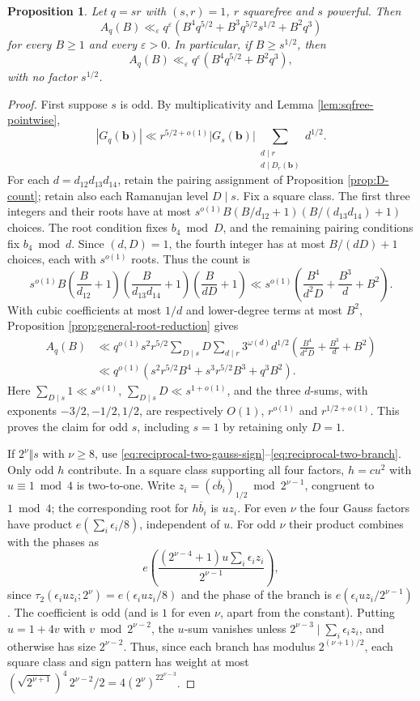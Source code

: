 \documentclass[12pt, a4paper]{amsart}
\numberwithin{equation}{section}
\newcommand{\e}{e}
\newcommand{\ep}{\varepsilon}
\renewcommand{\ge}{\geqslant}
\theoremstyle{plain}
\newtheorem{prop}[lem]{Proposition}
\begin{document}
\begin{prop}\label{prop:nsf-noloss}
Let $q=sr$ with $(s,r)=1$, $r$ squarefree and $s$ powerful. Then
$$
A_q(B)\ll_\ep q^\ep
\left(B^4q^{5/2}+B^3q^{5/2}s^{1/2}+B^2q^3\right)
$$
for every $B\ge1$ and every $\ep>0$. In particular, if $B\ge s^{1/2}$, then
$$
A_q(B)\ll_\ep q^\ep\left(B^4q^{5/2}+B^2q^3\right),
$$
with no factor $s^{1/2}$.
\end{prop}

\begin{proof}
First suppose $s$ is odd. By multiplicativity and Lemma \ref{lem:sqfree-pointwise},
$$
|G_q(\mathbf b)|\ll r^{5/2+o(1)}|G_s(\mathbf b)|
\sum_{\substack{d\mid r\\d\mid D_r(\mathbf b)}}d^{1/2}.
$$
For each $d=d_{12}d_{13}d_{14}$, retain the pairing assignment of Proposition \ref{prop:D-count}; retain also each Ramanujan level $D\mid s$. Fix a square class. The first three integers and their roots have at most $s^{o(1)}B(B/d_{12}+1)(B/(d_{13}d_{14})+1)$ choices. The root condition fixes $b_4\bmod D$, and the remaining pairing conditions fix $b_4\bmod d$. Since $(d,D)=1$, the fourth integer has at most $B/(dD)+1$ choices, each with $s^{o(1)}$ roots. Thus the count is
$$
s^{o(1)}B\left(\frac B{d_{12}}+1\right)
\left(\frac B{d_{13}d_{14}}+1\right)
\left(\frac B{dD}+1\right)\ll s^{o(1)}
\left(\frac{B^4}{d^2D}+\frac{B^3}{d}+B^2\right).
$$
With cubic coefficients at most $1/d$ and lower-degree terms at most $B^2$, Proposition \ref{prop:general-root-reduction} gives
$$
\begin{aligned}
A_q(B)&\ll q^{o(1)}s^2r^{5/2}
\sum_{D\mid s}D\sum_{d\mid r}3^{\omega(d)}d^{1/2}
\left(\frac{B^4}{d^2D}+\frac{B^3}{d}+B^2\right)\\
&\ll q^{o(1)}(s^2r^{5/2}B^4+s^3r^{5/2}B^3+q^3B^2).
\end{aligned}
$$
Here $\sum_{D\mid s}1\ll s^{o(1)}$, $\sum_{D\mid s}D\ll s^{1+o(1)}$, and the three $d$-sums, with exponents $-3/2,-1/2,1/2$, are respectively $O(1)$, $r^{o(1)}$ and $r^{1/2+o(1)}$. This proves the claim for odd $s$, including $s=1$ by retaining only $D=1$.

If $2^\nu\Vert s$ with $\nu\ge8$, use \eqref{eq:reciprocal-two-gauss-sign}--\eqref{eq:reciprocal-two-branch}. Only odd $h$ contribute. In a square class supporting all four factors, $h=cu^2$ with $u\equiv1\bmod4$ is two-to-one. Write $z_i=(c\overline{b}_i)_{1/2}\bmod2^{\nu-1}$, congruent to $1\bmod4$; the corresponding root for $h\overline{b}_i$ is $uz_i$. For even $\nu$ the four Gauss factors have product $\e(\sum_i\epsilon_i/8)$, independent of $u$. For odd $\nu$ their product combines with the phases as
$$
\e\left(\frac{(2^{\nu-4}+1)u\sum_i\epsilon_i z_i}{2^{\nu-1}}\right),
$$
since $\tau_2(\epsilon_iuz_i;2^\nu)=\e(\epsilon_iuz_i/8)$ and the phase of the branch is $\e(\epsilon_iuz_i/2^{\nu-1})$. The coefficient is odd (and is $1$ for even $\nu$, apart from the constant). Putting $u=1+4v$ with $v\bmod2^{\nu-2}$, the $u$-sum vanishes unless $2^{\nu-3}\mid\sum_i\epsilon_iz_i$, and otherwise has size $2^{\nu-2}$. Thus, since each branch has modulus $2^{(\nu+1)/2}$, each square class and sign pattern has weight at most $(\sqrt{2^{\nu+1}})^4\,2^{\nu-2}/2=4(2^\nu)^22^{\nu-3}$.


\end{proof}
\end{document}
